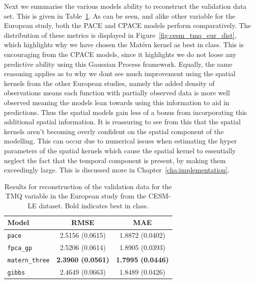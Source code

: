 Next we summarise the various models ability to reconstruct the validation data set.
This is given in Table~\ref{tab:train_cesm_tmq_eur}.
As can be seen, and alike other variable for the European study, both the PACE and CPACE models perform comparatively.
The distribution of these metrics is displayed in Figure~\ref{fig:cesm_tmq_eur_dist}, which highlights why we have chosen the Mat\'ern kernel as best in class.
This is encouraging from the CPACE models, since it highlights we do not loose any predictive ability using this Gaussian Process framework.
Equally, the same reasoning applies as to why we dont see much improvement using the spatial kernels from the other European studies, namely the added density of observations means each function with partially observed data is more well observed meaning the models lean towards using this information to aid in predictions.
Thus the spatial models gain less of a bonus from incorporating this additional spatial information.
It is reassuring to see from this that the spatial kernels aren't becoming overly confident on the spatial component of the modelling.
This can occur due to numerical issues when estimating the hyper parameters of the spatial kernels which cause the spatial kernel to essentially neglect the fact that the temporal component is present, by making them exceedingly large.
This is discussed more in Chapter~\ref{cha:implementation}.

\begin{table}
	\caption[Results for TMQ variable on validation data in the European study]{Results for reconstruction of the validation data for the TMQ variable in the European study from the CESM-LE dataset. Bold indicates best in class.}
	\centering
	\label{tab:train_cesm_tmq_eur}
	\begin{tabular}{lcc}
		\toprule
		\textbf{Model} & \textbf{RMSE} & \textbf{MAE} \\
		\midrule
		\verb*|pace| & 2.5156 (0.0615) & 1.8872	(0.0402) \\
		\verb*|fpca_gp| & 2.5206 (0.0614) & 1.8905 (0.0393) \\
		\verb*|matern_three| & \textbf{2.3960 (0.0561)} & \textbf{1.7995 (0.0446)}\\
		\verb*|gibbs| & 2.4649 (0.0663) & 1.8489 (0.0426)\\
		\bottomrule
	\end{tabular}
\end{table}


